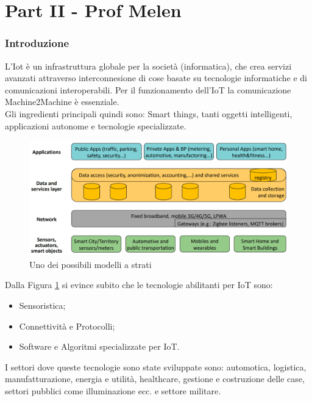 \documentclass[11pt, twocolumn]{article}
\newenvironment{myitemize}
{ \begin{itemize}[topsep=0ex]
		\setlength{\itemsep}{0pt}
		\setlength{\parskip}{0pt}
		\setlength{\parsep}{0pt}     }
	{ \end{itemize}                  }
\begin{document}
\newpage

\part*{Part II - Prof Melen}
\section{Introduzione}
L'Iot è un infrastruttura globale per la società (informatica), che crea servizi avanzati attraverso interconnesione di cose basate su tecnologie informatiche e di comunicazioni interoperabili.
Per il funzionamento dell'IoT la comunicazione Machine2Machine è essenziale.\\
Gli ingredienti principali quindi sono: Smart things, tanti oggetti intelligenti, applicazioni autonome e tecnologie specializzate.\\
\begin{figure}[!h]
	\centering	\includegraphics[width=\linewidth,height=5cm]{imgs/basic_layer.png}
	\caption{Uno dei possibili modelli a strati}
	\label{fig:basic_layer}
\end{figure}
      
\noindent Dalla Figura \ref{fig:basic_layer} si evince subito che le tecnologie abilitanti per IoT sono:
\begin{myitemize}
  \item Sensoristica;
  \item Connettività e Protocolli;
  \item Software e Algoritmi specializzate per IoT.
\end{myitemize}
I settori dove queste tecnologie sono state sviluppate sono: automotica, logistica, manufatturazione, energia e utilità, healthcare, gestione e costruzione delle case, settori pubblici come illuminazione ecc. e settore militare.
\end{document}

